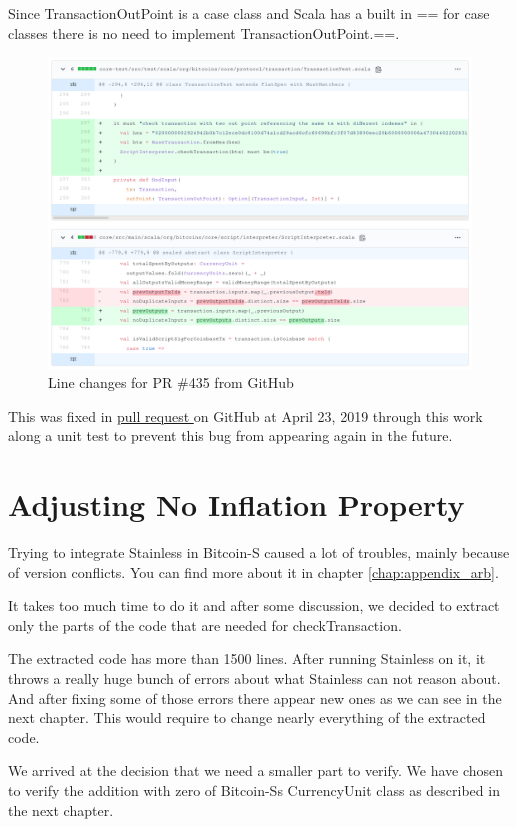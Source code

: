 Since TransactionOutPoint is a case class and Scala has a built in == for case classes there is no need to implement TransactionOutPoint.==.
\begin{figure}[H]
	\centering
		\includegraphics[scale=0.396]{images/bitcoin-s-pr.png}
	\caption{Line changes for PR \#435 from GitHub}
	\label{fig:output1}
\end{figure}

This was fixed in \href{https://github.com/bitcoin-s/bitcoin-s/pull/435}{pull request } on GitHub at April 23, 2019 through this work along a unit test to prevent this bug from appearing again in the future.


\section{Adjusting No Inflation Property}

Trying to integrate Stainless in Bitcoin-S caused a lot of troubles, mainly because of version conflicts.
You can find more about it in chapter \ref{chap:appendix_arb}.


It takes too much time to do it and after some discussion, we decided to extract only the parts of the code that are needed for checkTransaction.

The extracted code has more than 1500 lines.
After running Stainless on it, it throws a really huge bunch of errors about what Stainless can not reason about.
And after fixing some of those errors there appear new ones as we can see in the next chapter.
This would require to change nearly everything of the extracted code.

We arrived at the decision that we need a smaller part to verify.
We have chosen to verify the addition with zero of Bitcoin-Ss CurrencyUnit class as described in the next chapter.
